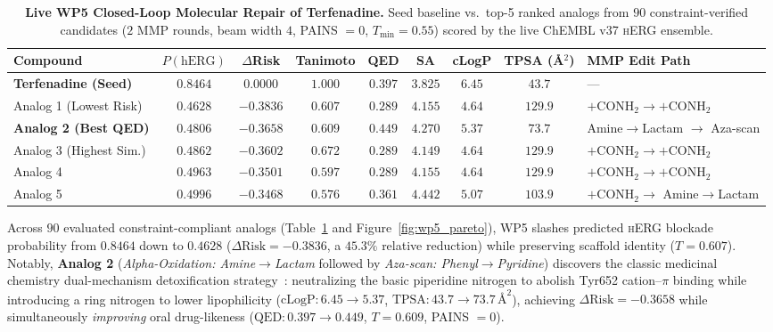 \documentclass[10pt,twocolumn,letterpaper]{article}
\begin{document}
\begin{table}[t]
  \centering
  \caption{\textbf{Live WP5 Closed-Loop Molecular Repair of Terfenadine.} Seed baseline vs.\ top-5 ranked analogs from $90$ constraint-verified candidates ($2$ MMP rounds, beam width $4$, PAINS $= 0$, $T_{\min} = 0.55$) scored by the live ChEMBL v37 \textsc{hERG} ensemble.}
  \label{tab:wp5_repair}
  \footnotesize
  \begin{tabular}{@{}lccccccc l@{}}
    \toprule
    \textbf{Compound} & \textbf{$P(\mathrm{hERG})$} & \textbf{$\Delta$Risk} & \textbf{Tanimoto} & \textbf{QED} & \textbf{SA} & \textbf{cLogP} & \textbf{TPSA (\AA$^2$)} & \textbf{MMP Edit Path} \\
    \midrule
    \textbf{Terfenadine (Seed)} & $0.8464$ & $0.0000$ & $1.000$ & $0.397$ & $3.825$ & $6.45$ & $43.7$ & --- \\
    \midrule
    Analog 1 (Lowest Risk) & $\mathbf{0.4628}$ & $\mathbf{-0.3836}$ & $0.607$ & $0.289$ & $4.155$ & $4.64$ & $129.9$ & $+\mathrm{CONH}_2 \to +\mathrm{CONH}_2$ \\
    \textbf{Analog 2 (Best QED)} & $\mathbf{0.4806}$ & $\mathbf{-0.3658}$ & $\mathbf{0.609}$ & $\mathbf{0.449}$ & $4.270$ & $5.37$ & $73.7$ & Amine$\to$Lactam $\to$ Aza-scan \\
    Analog 3 (Highest Sim.) & $0.4862$ & $-0.3602$ & $\mathbf{0.672}$ & $0.289$ & $4.149$ & $4.64$ & $129.9$ & $+\mathrm{CONH}_2 \to +\mathrm{CONH}_2$ \\
    Analog 4 & $0.4963$ & $-0.3501$ & $0.597$ & $0.289$ & $4.155$ & $4.64$ & $129.9$ & $+\mathrm{CONH}_2 \to +\mathrm{CONH}_2$ \\
    Analog 5 & $0.4996$ & $-0.3468$ & $0.576$ & $0.361$ & $4.442$ & $5.07$ & $103.9$ & $+\mathrm{CONH}_2 \to$ Amine$\to$Lactam \\
    \bottomrule
  \end{tabular}
\end{table}

Across $90$ evaluated constraint-compliant analogs (Table~\ref{tab:wp5_repair} and Figure~\ref{fig:wp5_pareto}), WP5 slashes predicted \textsc{hERG} blockade probability from $0.8464$ down to $0.4628$ ($\Delta\mathrm{Risk} = -0.3836$, a $45.3\%$ relative reduction) while preserving scaffold identity ($T = 0.607$). Notably, \textbf{Analog 2} (\textit{Alpha-Oxidation: Amine$\to$Lactam} followed by \textit{Aza-scan: Phenyl$\to$Pyridine}) discovers the classic medicinal chemistry dual-mechanism detoxification strategy~\cite{jamieson2006medicinal}: neutralizing the basic piperidine nitrogen to abolish Tyr652 cation--$\pi$ binding while introducing a ring nitrogen to lower lipophilicity ($\mathrm{cLogP}: 6.45 \to 5.37$, $\mathrm{TPSA}: 43.7 \to 73.7\,\text{\AA}^2$), achieving $\Delta\mathrm{Risk} = -0.3658$ while simultaneously \textit{improving} oral drug-likeness ($\mathrm{QED}: 0.397 \to 0.449$, $T = 0.609$, PAINS $= 0$).
\end{document}

